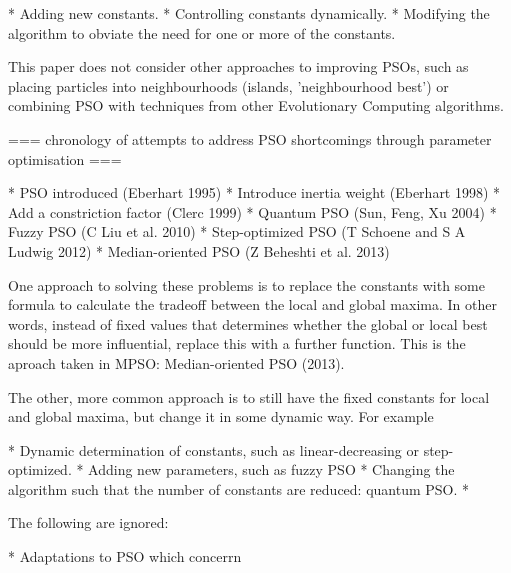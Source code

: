 * Adding new constants.
* Controlling constants dynamically.
* Modifying the algorithm to obviate the need for one or more of the constants.

This paper does not consider other approaches to improving PSOs, such as
placing particles into neighbourhoods (islands, 'neighbourhood best') or
combining PSO with techniques from other Evolutionary Computing algorithms.

=== chronology of attempts to address PSO shortcomings through parameter
optimisation ===

* PSO introduced (Eberhart 1995)
* Introduce inertia weight (Eberhart 1998)
* Add a constriction factor (Clerc 1999)
* Quantum PSO (Sun, Feng, Xu 2004)
* Fuzzy PSO (C Liu et al. 2010)
* Step-optimized PSO (T Schoene and S A Ludwig 2012)
* Median-oriented PSO (Z Beheshti et al. 2013)

One approach to solving these problems is to replace the constants with some
formula to calculate the tradeoff between the local and global maxima.  In
other words, instead of fixed values that determines whether the global or
local best should be more influential, replace this with a further function.
This is the aproach taken in MPSO: Median-oriented PSO (2013).

The other, more common approach is to still have the fixed constants for local
and global maxima, but change it in some dynamic way. For example





* Dynamic determination of constants, such as linear-decreasing or
step-optimized.
* Adding new parameters, such as fuzzy PSO
* Changing the algorithm such that the number of constants are reduced: quantum
PSO.
* 

The following are ignored:

* Adaptations to PSO which concerrn 
